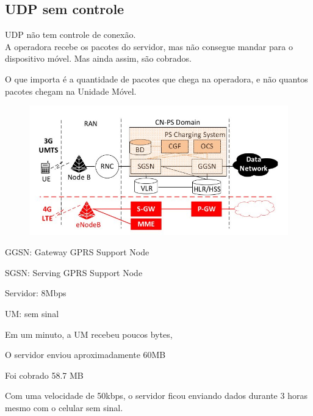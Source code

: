 \documentclass[brazil]{beamer}
\begin{document}
\subsection{UDP sem controle}

\begin{frame}[fragile]
    UDP não tem controle de conexão. \\
    A operadora recebe os pacotes do servidor, mas não consegue mandar para o dispositivo móvel. Mas ainda assim, são cobrados.
\end{frame}

\begin{frame}[fragile]
    O que importa é a quantidade de pacotes que chega na operadora, e não quantos pacotes chegam na Unidade Móvel.
    \begin{figure}
    \begin{center}
        \includegraphics[scale=0.3]{images/arquitetura3G.jpg}
    \end{center}
    \end{figure}
    GGSN: Gateway GPRS Support Node
    
    SGSN: Serving GPRS Support Node
\end{frame}

\begin{frame}[fragile]
    Servidor: 8Mbps

    UM: sem sinal
    
    \vspace{0.4cm}

    Em um minuto, a UM recebeu poucos bytes,

    O servidor enviou aproximadamente 60MB
  
    Foi cobrado 58.7 MB
\end{frame}

\begin{frame}[fragile]
    Com uma velocidade de 50kbps, o servidor ficou enviando dados durante 3 horas mesmo com o celular sem sinal.
\end{frame}
\end{document}
